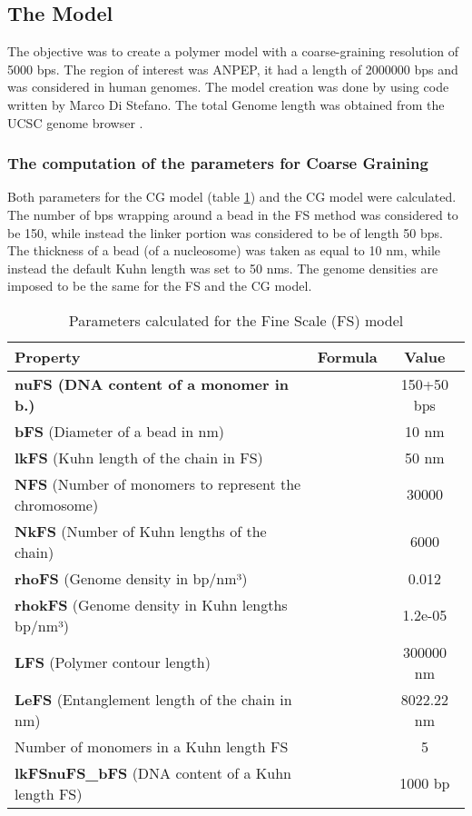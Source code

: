 \subsection{The Model}
The objective was to create a polymer model with a coarse-graining resolution of 5000 bps. The region of interest was ANPEP, it had a length of 2000000 bps and was considered in human genomes. 
The model creation was done by using code written by Marco Di Stefano.
The total Genome length was obtained from the UCSC genome browser
\cite{UCSCGenomeBrowser}
.

\subsubsection{The computation of the parameters for Coarse Graining}
Both parameters for the CG model (table \ref{tab: parameters FS}) and the CG model were calculated. The number of bps wrapping around a bead in the FS method was considered to be 150, while instead the linker portion was considered to be of length 50 bps. The thickness of a bead (of a nucleosome) was taken as equal to 10 nm, while instead the default Kuhn length was set to 50 nms. The genome densities are imposed to be the same for the FS and the CG model.

\begin{table}[H]
\begin{tabular}{|l|l|c|}
\hline
\textbf{Property} & \textbf{Formula} & \textbf{Value}\\
\hline
\textbf{nuFS (DNA content of a monomer in b.)} &  & 150+50 bps\\
\hline
\textbf{bFS} (Diameter of a bead in nm) & & 10 nm\\
\hline
\textbf{lkFS} (Kuhn length of the chain  in FS) & & 50 nm \\
\hline
\textbf{NFS} (Number of monomers to represent the chromosome) & & 30000\\
\hline
\textbf{NkFS} (Number of Kuhn lengths of the chain) & & 6000\\
\hline
\textbf{rhoFS} (Genome density in bp/nm³) & & 0.012\\
\hline
\textbf{rhokFS} (Genome density in Kuhn lengths bp/nm³) & & 1.2e-05\\
\hline
\textbf{LFS} (Polymer contour length) & & 300000 nm\\
\hline
\textbf{LeFS} (Entanglement length of the chain in nm) & & 8022.22 nm\\
\hline
Number of monomers in a Kuhn length FS & & 5\\
\hline
\textbf{lkFSnuFS\_bFS} (DNA content of a Kuhn length FS) & & 1000 bp\\
\hline
\end{tabular}
\label{tab: parameters FS}
\caption{Parameters calculated for the Fine Scale (FS) model}
\end{table}

